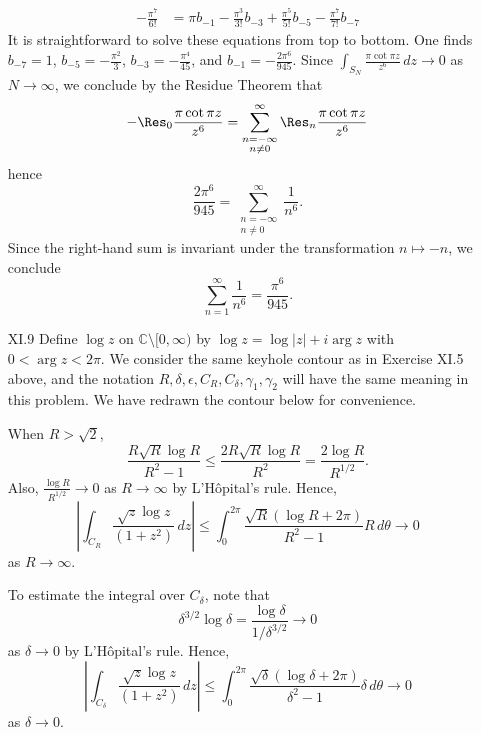 \documentclass[11pt]{book}
\theoremstyle{definition}
\begin{document}
\begin{enumerate}
\begin{align*}
        -\frac{\pi^7}{6!} &= \pi b_{-1} - \frac{\pi^3}{3!} b_{-3} + \frac{\pi^5}{5!} b_{-5} - \frac{\pi^7}{7!} b_{-7} 
      \end{align*}
      It is straightforward to solve these equations from top to bottom.  One finds $b_{-7}=1$, $b_{-5} = - \frac{\pi^2}{3}$, $b_{-3} = - \frac{\pi^4}{45}$, and $b_{-1} = - \frac{2\pi^6}{945}$.   Since $\int_{S_N} \frac{\pi \cot \pi z}{z^6} \, dz \to 0$ as $N\to \infty$, we conclude by the Residue Theorem that 
      \[ - \Res_0 \frac{\pi \cot \pi z}{z^6} = \sum_{\substack{n=-\infty\\ n\neq 0}}^\infty \Res_n \frac{\pi \cot \pi z}{z^6} \] hence
      \[ \frac{2\pi^6}{945} = \sum_{\substack{n=-\infty\\ n\neq 0}}^\infty  \frac{1}{n^6}. \] Since the right-hand sum is invariant under the transformation $n\mapsto -n$, we conclude 
      \[\sum_{n=1}^\infty \frac{1}{n^6} = \frac{\pi^6}{945} .\] 


    \item[XI.9] Define $\log z$ on $\mathbb C \setminus [0, \infty)$ by $\log z = \log |z| + i \arg z $ with $0 < \arg z < 2\pi$.  We consider the same keyhole contour as in Exercise XI.5 above, and the notation $R, \delta, \epsilon, C_R, C_\delta, \gamma_1, \gamma_2$ will have the same meaning in this problem.  We have redrawn the contour below for convenience.


        When $R>\sqrt 2$, 
        \[ \frac{R\sqrt R \log R }{R^2-1} \leq \frac{2R\sqrt R \log R}{R^2} = \frac{2\log R}{R^{1/2}} .\] Also, $\frac{\log R}{R^{1/2}} \to 0$ as $R\to \infty$ by L'H\^opital's rule.  Hence, 
        \[ \left| \int_{C_R} \frac{\sqrt z \log z}{(1+z^2)} \, dz \right| \leq \int_0^{2\pi } \frac{\sqrt R ( \log R + 2\pi ) }{R^2-1 } R \, d\theta  \to 0 \] as $R\to \infty$.  

        To estimate the integral over $C_\delta$, note that 
        \[\delta^{3/2} \log \delta =  \frac{\log \delta}{1 / \delta^{3/2}}  \to 0 \] as $\delta\to 0$ by L'H\^opital's rule.   Hence,
        \[ \left| \int_{C_\delta} \frac{\sqrt z \log z}{(1+z^2)} \, dz \right| \leq \int_0^{2\pi} \frac{\sqrt \delta ( \log \delta + 2\pi )}{\delta^2-1} \delta \, d\theta \to 0 \] as $\delta \to 0$. 


\end{enumerate}
\end{document}
